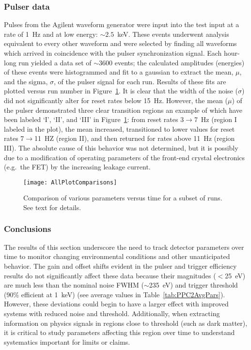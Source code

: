 		    	\subsubsection{Pulser data}
			\label{sec:DeploymentPPC2SoudanAnalysisPulserData}    

	Pulses from the Agilent waveform generator were input into the test input at a rate of 1~Hz and at low energy: $\sim2.5$~keV.  These events underwent analysis equivalent to every other waveform and were selected by finding all waveforms which arrived in coincidence with the pulser synchronization signal.  Each hour-long run yielded a data set of $\sim3600$ events; the calculated amplitudes (energies) of these events were histogrammed and fit to a gaussian to extract the mean, $\mu$, and the sigma, $\sigma$, of the pulser signal for each run.  Results of these fits are plotted versus run number in Figure~\ref{fig:PPC2AllPlotCompare}.  It is clear that the width of the noise ($\sigma$) did not significantly alter for reset rates below 15~Hz.  However, the mean ($\mu$) of the pulser demonstrated three clear transition regions an example of which have been labeled `I', `II', and `III' in Figure~\ref{fig:PPC2AllPlotCompare}: from reset rates 3$\to$7~Hz (region I labeled in the plot), the mean increased, transitioned to lower values for reset rates 7$\to$11~HZ (region II), and then returned for rates above 11~Hz (region III).  The absolute cause of this behavior was not determined, but it is possibly due to a modification of operating parameters of the front-end crystal electronics (e.g.~the FET) by the increasing leakage current.  
			
				\begin{figure}
					\centering
					\texttt{[image: AllPlotComparisons]}
					\caption[Comparison of various parameters versus time for a subset of runs]
					{Comparison of various parameters versus time for a subset of runs.  See text for details.}
					\label{fig:PPC2AllPlotCompare}
				\end{figure}
	
	    	\subsubsection{Conclusions}
		\label{sec:DeploymentPPC2SoudanAnalysisParsTimeConclusion}    	
	
	The results of this section underscore the need to track detector parameters over time to monitor changing environmental conditions and other unanticipated behavior.  The gain and offset shifts evident in the pulser and trigger efficiency results do not significantly affect these data because their magnitudes ($<$25~eV) are much less than the nominal noise FWHM ($\sim$235~eV) and trigger threshold (90\% efficient at 1~keV) (see average values in Table~\ref{tab:PPC2AvgPars}).  However, these deviations could begin to have a larger effect with improved systems with reduced noise and threshold.  Additionally, when extracting information on physics signals in regions close to threshold (such as dark matter), it is critical to study parameters affecting this region over time to understand systematics important for limits or claims.  
	
